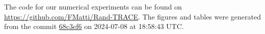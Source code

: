 The code for our numerical experiments can be found on \url{https://github.com/FMatti/Rand-TRACE}. The figures and tables were generated from the commit \href{https://github.com/FMatti/Rand-TRACE/tree/68c3ef6}{68c3ef6} on 2024-07-08 at 18:58:43 UTC.
